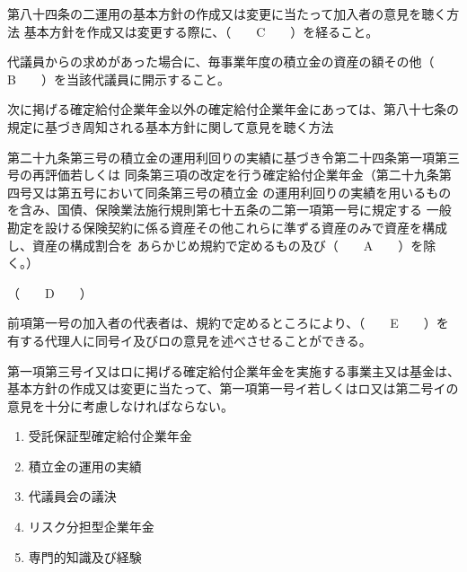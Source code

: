\begin{fillblank}[年金2 2019 問題1(4)]
\begin{lawstructure}
\begin{lawarticle}{第八十四条の二}{運用の基本方針の作成又は変更に当たって加入者の意見を聴く方法}
      基本方針を作成又は変更する際に、（　　C　　）を経ること。

      代議員からの求めがあった場合に、毎事業年度の積立金の資産の額その他（　　B　　）を当該代議員に開示すること。

      次に掲げる確定給付企業年金以外の確定給付企業年金にあっては、第八十七条の規定に基づき周知される基本方針に関して意見を聴く方法

      第二十九条第三号の積立金の運用利回りの実績に基づき令第二十四条第一項第三号の再評価若しくは
      同条第三項の改定を行う確定給付企業年金（第二十九条第四号又は第五号において同条第三号の積立金
      の運用利回りの実績を用いるものを含み、国債、保険業法施行規則第七十五条の二第一項第一号に規定する
      一般勘定を設ける保険契約に係る資産その他これらに準ずる資産のみで資産を構成し、資産の構成割合を
      あらかじめ規約で定めるもの及び（　　A　　）を除く。）

      （　　D　　）

      前項第一号の加入者の代表者は、規約で定めるところにより、（　　E　　）を有する代理人に同号イ及びロの意見を述べさせることができる。

      第一項第三号イ又はロに掲げる確定給付企業年金を実施する事業主又は基金は、基本方針の作成又は変更に当たって、第一項第一号イ若しくはロ又は第二号イの意見を十分に考慮しなければならない。
    \end{lawarticle}
  \end{lawstructure}
\end{fillblank}


\begin{answerbox}
  \begin{enumerate}[A: ]
    \item 受託保証型確定給付企業年金
    \item 積立金の運用の実績
    \item 代議員会の議決
    \item リスク分担型企業年金
    \item 専門的知識及び経験
  \end{enumerate}
\end{answerbox}

